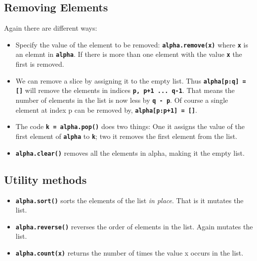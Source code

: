 \documentclass[11pt,a4paper]{article}
\newcommand{\Code}[1]{\textbf{\texttt{#1}}}
\begin{document}
\subsection*{Removing Elements}
Again there are different ways:
    \begin{itemize}
        \item Specify the value of the element to be removed:  \Code{alpha.remove(x)} where \Code{x} is an elemnt in \Code{alpha}. If there is more than one element with the value \Code{x} the first is removed.
        \item We can remove a slice by assigning it to the empty list. Thus \Code{alpha[p:q] = []} will remove the elements in indices \Code{p, p+1 ... q-1}. That means the number of elements in the list is now less by \Code{q - p}. Of course a single element at index p can be removed by, \Code{alpha[p:p+1] = []}.
        \item The code \Code{k = alpha.pop()} does two things: One it assigns the value of the first element of \Code{alpha} to \Code{k}; two it removes the first element from the list. 
        \item \Code{alpha.clear()} removes all the elements in alpha, making it the empty list.
    \end{itemize}
    \subsection*{Utility methods}
    \begin{itemize}
        \item \Code{alpha.sort()} sorts the elements of the list \emph{in place}. That is it mutates the list.
        \item \Code{alpha.reverse()} reverses the order of elements in the list. Again mutates the list.
        \item \Code{alpha.count(x)} returns the number of times the value x occurs in the list.
    \end{itemize}
\end{document}
